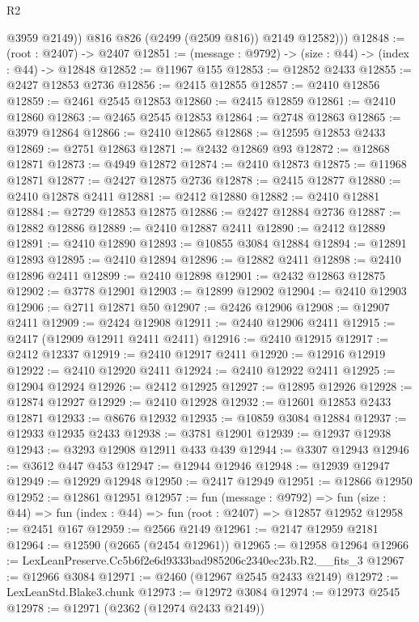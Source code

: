 \begin{lexlean}{R2}
\begin{coremodule}
              @3959
              @2149))
          @816
          @826
          (@2499 (@2509 @816))
          @2149
          @12582)))
@12848 := (root : @2407) -> @2407
@12851 := (message : @9792) -> (size : @44) -> (index : @44) -> @12848
@12852 := @11967 @155
@12853 := @12852 @2433
@12855 := @2427 @12853 @2736
@12856 := @2415 @12855
@12857 := @2410 @12856
@12859 := @2461 @2545 @12853
@12860 := @2415 @12859
@12861 := @2410 @12860
@12863 := @2465 @2545 @12853
@12864 := @2748 @12863
@12865 := @3979 @12864
@12866 := @2410 @12865
@12868 := @12595 @12853 @2433
@12869 := @2751 @12863
@12871 := @2432 @12869 @93
@12872 := @12868 @12871
@12873 := @4949 @12872
@12874 := @2410 @12873
@12875 := @11968 @12871
@12877 := @2427 @12875 @2736
@12878 := @2415 @12877
@12880 := @2410 @12878 @2411
@12881 := @2412 @12880
@12882 := @2410 @12881
@12884 := @2729 @12853 @12875
@12886 := @2427 @12884 @2736
@12887 := @12882 @12886
@12889 := @2410 @12887 @2411
@12890 := @2412 @12889
@12891 := @2410 @12890
@12893 := @10855 @3084 @12884
@12894 := @12891 @12893
@12895 := @2410 @12894
@12896 := @12882 @2411
@12898 := @2410 @12896 @2411
@12899 := @2410 @12898
@12901 := @2432 @12863 @12875
@12902 := @3778 @12901
@12903 := @12899 @12902
@12904 := @2410 @12903
@12906 := @2711 @12871 @50
@12907 := @2426 @12906
@12908 := @12907 @2411
@12909 := @2424 @12908
@12911 := @2440 @12906 @2411
@12915 := @2417 (@12909 @12911 @2411 @2411)
@12916 := @2410 @12915
@12917 := @2412 @12337
@12919 := @2410 @12917 @2411
@12920 := @12916 @12919
@12922 := @2410 @12920 @2411
@12924 := @2410 @12922 @2411
@12925 := @12904 @12924
@12926 := @2412 @12925
@12927 := @12895 @12926
@12928 := @12874 @12927
@12929 := @2410 @12928
@12932 := @12601 @12853 @2433 @12871
@12933 := @8676 @12932
@12935 := @10859 @3084 @12884
@12937 := @12933 @12935 @2433
@12938 := @3781 @12901
@12939 := @12937 @12938
@12943 := @3293 @12908 @12911 @433 @439
@12944 := @3307 @12943
@12946 := @3612 @447 @453
@12947 := @12944 @12946
@12948 := @12939 @12947
@12949 := @12929 @12948
@12950 := @2417 @12949
@12951 := @12866 @12950
@12952 := @12861 @12951
@12957 := fun (message : @9792) =>
  fun (size : @44) => fun (index : @44) => fun (root : @2407) => @12857 @12952
@12958 := @2451 @167
@12959 := @2566 @2149
@12961 := @2147 @12959 @2181
@12964 := @12590 (@2665 (@2454 @12961))
@12965 := @12958 @12964
@12966 := LexLeanPreserve.Cc5b6f2e6d9333bad985206c2340ec23b.R2.__fits_3
@12967 := @12966 @3084
@12971 := @2460 (@12967 @2545 @2433 @2149)
@12972 := LexLeanStd.Blake3.chunk
@12973 := @12972 @3084
@12974 := @12973 @2545
@12978 := @12971 (@2362 (@12974 @2433 @2149))

\end{coremodule}
\end{lexlean}
